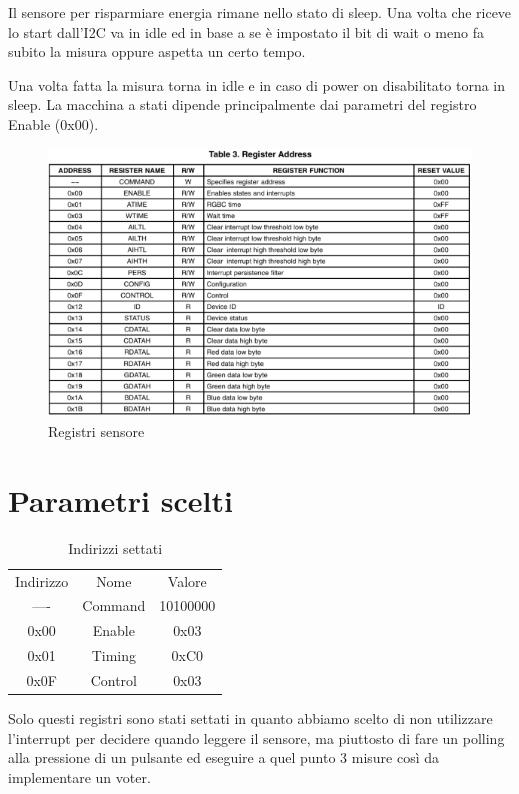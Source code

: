 \documentclass[12pt]{report}
\begin{document}
Il sensore per risparmiare energia rimane nello stato di sleep. Una volta che riceve lo start dall'I2C va in idle ed in base a se è impostato il bit di wait o meno fa subito la misura oppure aspetta un certo tempo.

Una volta fatta la misura torna in idle e in caso di power on disabilitato torna in sleep. La macchina a stati dipende principalmente dai parametri del registro Enable (0x00).

\begin{figure}
    \includegraphics[width=\textwidth]{Immagini_sensore/Indirizzi_sensore.png}
    \caption{Registri sensore}
\end{figure} 

\section{Parametri scelti}
\label{sec:Parametri sensore}
\begin{table}
    \centering
    \begin{tabular}{ccc}
        Indirizzo & Nome & Valore \\
        ---- & Command & 10100000 \\
        0x00 & Enable & 0x03 \\
        0x01 & Timing & 0xC0 \\
        0x0F & Control & 0x03
    \end{tabular}
    \caption{Indirizzi settati}
    \label{tab:my_label}
\end{table}

Solo questi registri sono stati settati in quanto abbiamo scelto di non utilizzare l'interrupt per decidere quando leggere il sensore, ma piuttosto di fare un polling alla pressione di un pulsante ed eseguire a quel punto 3 misure così da implementare un voter.
\end{document}
